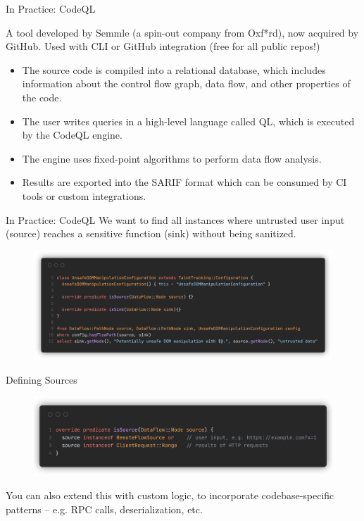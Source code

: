 \documentclass[aspectratio=169,xcolor=dvipsnames]{beamer}
\begin{document}
\begin{frame}{In Practice: CodeQL}

	A tool developed by Semmle (a spin-out company from Oxf*rd), now acquired by
	GitHub. Used with CLI or GitHub integration (free for all public repos!)
	\bigskip

	\begin{itemize}
		\item The source code is compiled into a relational database, which includes
		      information about the control flow graph, data flow, and other properties of
		      the code.
		\item The user writes queries in a high-level language called QL, which is executed
		      by the CodeQL engine.
		\item The engine uses fixed-point algorithms to perform data flow analysis.
		\item Results are exported into the SARIF format which can be consumed by CI tools or
		      custom integrations.
	\end{itemize}
\end{frame}

\begin{frame}{In Practice: CodeQL}
	We want to find all instances where untrusted user input (source) reaches a
	sensitive function (sink) without being sanitized.

	\begin{figure}
		\includegraphics[width=\textwidth]{img/3.png}
	\end{figure}
\end{frame}

\begin{frame}{Defining Sources}

	\begin{figure}
		\includegraphics[width=\textwidth]{img/4.png}
	\end{figure}

	You can also extend this with custom logic, to incorporate codebase-specific
	patterns -- e.g. RPC calls, deserialization, etc.

\end{frame}
\end{document}
